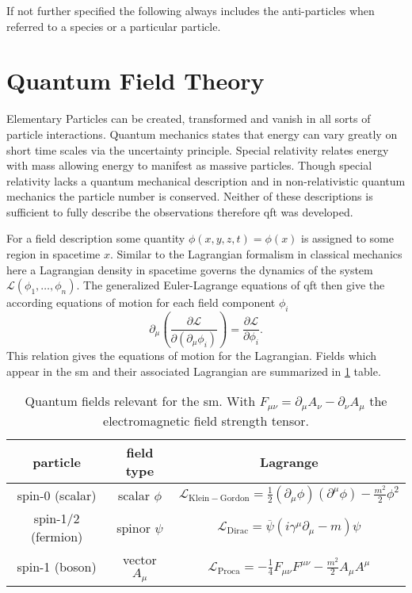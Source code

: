 If not further specified the following always includes the anti-particles when referred to a species or a particular particle.

\section{Quantum Field Theory}\label{sec:qft}
Elementary Particles can be created, transformed and vanish in all sorts of particle interactions. Quantum mechanics states that energy can vary greatly on short time scales via the uncertainty principle. Special relativity relates energy with mass allowing energy to manifest as massive particles. Though special relativity lacks a quantum mechanical description and in non-relativistic quantum mechanics the particle number is conserved. Neither of these descriptions is sufficient to fully describe the observations therefore \ac{qft} was developed.

For a field description some quantity $\phi(x,y,z,t)=\phi(x)$ is assigned to some region in spacetime $x$. Similar to the Lagrangian formalism in classical mechanics here a Lagrangian density in spacetime governs the dynamics of the system $\mathcal{L}(\phi_1,\dots,\phi_n)$. The generalized Euler-Lagrange equations of qft then give the according equations of motion for each field component $\phi_i$
\begin{equation}
    \partial_\mu \left(\frac{\partial\mathcal{L}}{\partial(\partial_\mu\phi_i)}\right)=\frac{\partial\mathcal{L}}{\partial \phi_i}.
\end{equation}
This relation gives the equations of motion for the Lagrangian. Fields which appear in the \ac{sm} and their associated Lagrangian are summarized in \ref{tab:fields} table.
\begin{table}
    \begin{center}
        \begin{tabular}{c|c|c}
            particle           & field type      & Lagrange                                                                                                     \\ [1ex]  \hline
            spin-0 (scalar)    & scalar $\phi$   & $\mathcal{L}_\mathrm{Klein-Gordon}=\frac{1}{2} (\partial_\mu \phi )(\partial^\mu \phi)-\frac{m^2}{2}\phi^2 $ \\  [1.5ex]
            spin-1/2 (fermion) & spinor $\psi$   & $\mathcal{L}_\mathrm{Dirac}= \overline{\psi}(i \gamma^\mu \partial_\mu - m )\psi$                            \\  [1.5ex]
            spin-1 (boson)     & vector  $A_\mu$ & $\mathcal{L}_\mathrm{Proca}= -\frac{1}{4}F_{\mu\nu}F^{\mu\nu} -\frac{m^2}{2} A_\mu A^\mu$                    \\  [2ex]
        \end{tabular}
        \caption{Quantum fields relevant for the \ac{sm}. With $F_{\mu\nu}=\partial_\mu A_\nu - \partial_\nu A_\mu$ the electromagnetic field strength tensor.}
        \label{tab:fields}
    \end{center}
\end{table}

